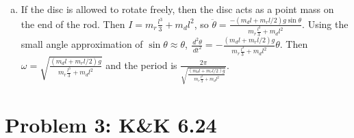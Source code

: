 \documentclass[solutions]{esg8012pset}
\renewcommand{\d}{\,d}
\begin{document}
\begin{enumerate}[(a)]
\begin{proof}
\begin{align*}
        & = \vec \omega \left( d^2 m_T +  I_{\ell_1} + 2\vec d \cdot \vec 0 \right) \\
        & = \vec \omega \left( d^2 m_T +  I_{\ell_1} \right) \\
        \\
        I_{\ell_2} & = I_{\ell_1} + d^2 m_T
      \end{align*}
    \end{proof}
    $\alpha = \ddot\theta = \frac{\d L / \d t}{I}$.  \begin{align*}
    I & = m_r\int_0^l r^2 \d r + m_d l^2 + \int_0^R \frac{m_d 2 \pi r}{\pi R^2} r^2 \d r \\
      & = m_r\frac{l^3}{3} + m_d l^2 + \frac{m_d 2}{R^2}\int_0^R r^3 \d r \\
      & = m_r\frac{l^3}{3} + m_d l^2 + \frac{m_d 2 R^4}{4 R^2} \\
      & = m_r\frac{l^3}{3} + m_d l^2 + \frac{m_d R^2}{2}
    \end{align*} Then $\ddot \theta = \frac{-(m_d l + m_r l / 2)g\sin\theta}{m_r\frac{l^3}{3} + m_d l^2 + \frac{m_d R^2}{2}}$.  Using the small angle approximation of $\sin\theta\approx \theta$, $\frac{\d^2 \theta}{\d t^2} = -\frac{(m_d l + m_r l / 2)g}{m_r\frac{l^3}{3} + m_d l^2 + \frac{m_d R^2}{2}}\theta$.  Then $\omega = \sqrt{\frac{(m_d l + m_r l / 2)g}{m_r\frac{l^3}{3} + m_d l^2 + \frac{m_d R^2}{2}}}$ and the period is $\frac{2\pi}{\sqrt{\frac{(m_d l + m_r l / 2)g}{m_r\frac{l^3}{3} + m_d l^2 + \frac{m_d R^2}{2}}}}$.
    \item If the disc is allowed to rotate freely, then the disc acts as a point mass on the end of the rod.  Then $I = m_r\frac{l^3}{3} + m_d l^2$, so $\ddot \theta = \frac{-(m_d l + m_r l / 2)g\sin\theta}{m_r\frac{l^3}{3} + m_d l^2}$.  Using the small angle approximation of $\sin\theta\approx \theta$, $\frac{\d^2 \theta}{\d t^2} = -\frac{(m_d l + m_r l / 2)g}{m_r\frac{l^3}{3} + m_d l^2}\theta$.  Then $\omega = \sqrt{\frac{(m_d l + m_r l / 2)g}{m_r\frac{l^3}{3} + m_d l^2}}$ and the period is $\frac{2\pi}{\sqrt{\frac{(m_d l + m_r l / 2)g}{m_r\frac{l^3}{3} + m_d l^2}}}$.
  \end{enumerate}
\section*{Problem 3: K\&K 6.24}
\end{document}
